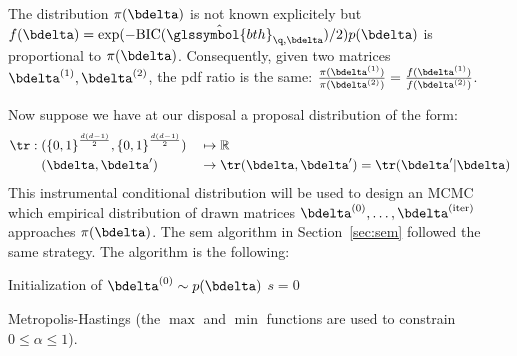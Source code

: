 The distribution $\pi(\bdelta)$ is not known explicitely but $f(\bdelta) = \exp(-\text{BIC}(\hat{\glssymbol{bth}}_{\q,\bdelta})/2) p(\bdelta)$ is proportional to $\pi(\bdelta)$. Consequently, given two matrices $\bdelta^{(1)},\bdelta^{(2)}$, the \gls{pdf} ratio is the same: $\frac{\pi(\bdelta^{(1)})}{\pi(\bdelta^{(2)})} = \frac{f(\bdelta^{(1)})}{f(\bdelta^{(2)})}$.

Now suppose we have at our disposal a proposal distribution of the form:
\begin{alignat}{2}
\tr: \; & ({\{0,1\}}^{\frac{d(d-1)}{2}},{\{0,1\}}^{\frac{d(d-1)}{2}}) && \mapsto \mathbb{R} \nonumber \\ 
& (\bdelta,\bdelta') && \to \tr(\bdelta,\bdelta') = \tr(\bdelta' | \bdelta) \nonumber
\end{alignat}
This instrumental conditional distribution will be used to design an MCMC which empirical distribution of drawn matrices $\bdelta^{(0)}, \dots, \bdelta^{(\text{iter})}$ approaches $\pi(\bdelta)$. The \gls{sem} algorithm in Section~\ref{sec:sem} followed the same strategy. The algorithm is the following:

\begin{algorithm}[H]
 Initialization of $ \bdelta^{(0)} \sim p(\bdelta)$\;
 $s = 0$\;
\caption{\label{metropolis} Metropolis-Hastings (the $\max$ and $\min$ functions are used to constrain $0 \leq \alpha \leq 1$).}
\label{alg:metro}
\end{algorithm}

